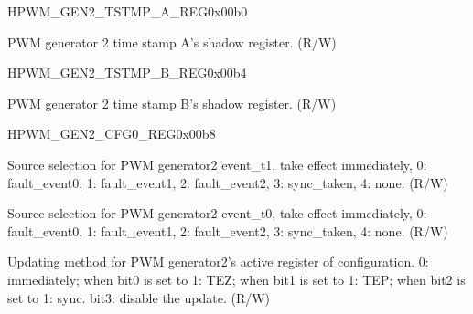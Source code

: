\begin{register}{H}{PWM\_GEN2\_TSTMP\_A\_REG}{0x00b0}\label{regdesc:PWMGEN2TSTMPAREG}
%
%
\regnewline%
\begin{regdesc}\begin{reglist}
\item [PWM\_GEN2\_A]PWM generator 2 time stamp A's shadow register. (R/W)
\end{reglist}\end{regdesc}
\end{register}


\begin{register}{H}{PWM\_GEN2\_TSTMP\_B\_REG}{0x00b4}\label{regdesc:PWMGEN2TSTMPBREG}
%
%
\regnewline%
\begin{regdesc}\begin{reglist}
\item [PWM\_GEN2\_B]PWM generator 2 time stamp B's shadow register. (R/W)
\end{reglist}\end{regdesc}
\end{register}


\begin{register}{H}{PWM\_GEN2\_CFG0\_REG}{0x00b8}\label{regdesc:PWMGEN2CFG0REG}
%
%
%
%
\regnewline%
\begin{regdesc}\begin{reglist}
\item [PWM\_GEN2\_T1\_SEL]Source selection for PWM generator2 event\_t1, take effect immediately, 0: fault\_event0, 1: fault\_event1, 2: fault\_event2, 3: sync\_taken, 4: none. (R/W)
\item [PWM\_GEN2\_T0\_SEL]Source selection for PWM generator2 event\_t0, take effect immediately, 0: fault\_event0, 1: fault\_event1, 2: fault\_event2, 3: sync\_taken, 4: none. (R/W)
\item [PWM\_GEN2\_CFG\_UPMETHOD]Updating method for PWM generator2's active register of configuration. 0: immediately; when bit0 is set to 1: TEZ; when bit1 is set to 1: TEP; when bit2 is set to 1: sync. bit3: disable the update. (R/W)
\end{reglist}\end{regdesc}
\end{register}


